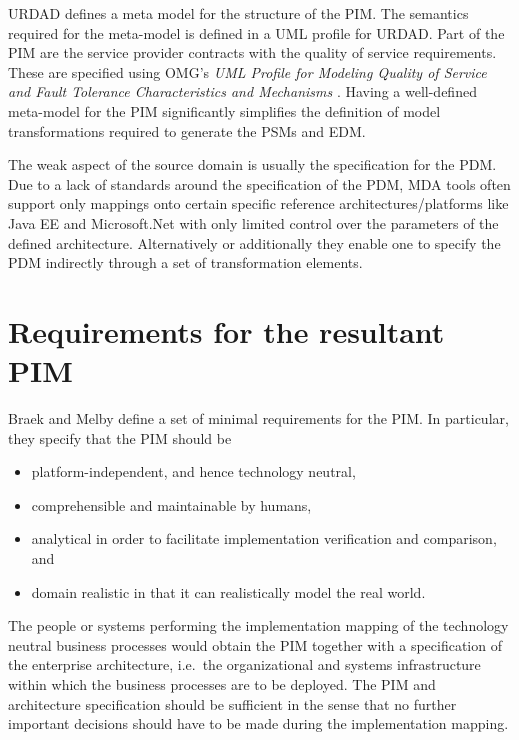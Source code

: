 \documentclass{IOS-Book-Article}
\begin{document}
URDAD defines a meta model for the
structure of the PIM. The semantics required for the meta-model is defined in a UML profile for URDAD.
Part of the PIM are the service provider contracts with the quality of service requirements. These are
specified using OMG's {\em UML Profile for Modeling Quality of Service and Fault Tolerance Characteristics
and Mechanisms} \cite{omg:umlProfileQos}. Having a well-defined meta-model for the PIM significantly
simplifies the definition of model transformations required to generate the PSMs and EDM.

The weak aspect of the source domain is usually the specification for the PDM.
Due to a lack of standards around the specification of the PDM, MDA tools often support only
mappings onto certain specific reference architectures/platforms like Java EE and Microsoft.Net
with only limited control over the parameters of the defined architecture. Alternatively
or additionally they enable one to specify the PDM indirectly through a set of transformation
elements.



\section{Requirements for the resultant PIM}
\label{sec:pimRequirements}

Braek and Melby \cite{braek:modelDrivenServiceEngineering} define a set
of minimal requirements for the PIM. In particular, they specify that the
PIM should be
\begin{itemize}
  \item platform-independent, and hence technology neutral,
  \item comprehensible and maintainable by humans,
  \item analytical in order to facilitate implementation verification and
comparison, and
  \item domain realistic in that it can realistically model the real world.
\end{itemize}

The people or systems performing the implementation mapping of the
technology neutral business processes would obtain the PIM together
with a specification of the enterprise architecture, i.e.\ the organizational
and systems infrastructure within which the business processes are to be
deployed. The PIM and architecture specification should be sufficient
in the sense that no further important
decisions should have to be made during the implementation mapping.
\end{document}
